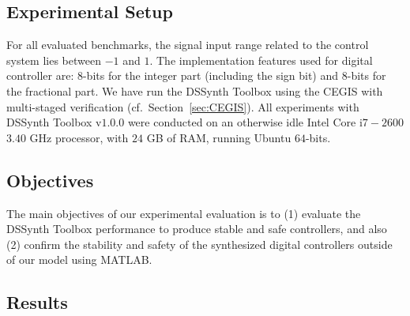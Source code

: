 \documentclass[10pt,conference]{IEEEtran}
\newcommand\tool{{DSSynth Toolbox}\xspace}
\begin{document}

\subsection{Experimental Setup}
\label{experimental-setup}

For all evaluated benchmarks, the signal input range related to the control
system lies between $-1$ and $1$.  The implementation features used for
digital controller are: $8$-bits for the integer part (including the sign
bit) and $8$-bits for the fractional part.  We have run the \tool using the
CEGIS with multi-staged verification (cf.~Section~\ref{sec:CEGIS}).  All
experiments with \tool v$1$.$0$.$0$ were conducted on an otherwise idle
Intel Core i$7-2600$ $3.40$ GHz processor, with $24$ GB of RAM, running
Ubuntu $64$-bits.

\subsection{Objectives}

The main objectives of our experimental evaluation is to (1) evaluate the \tool performance 
to produce stable and safe controllers, and also (2) confirm the stability and safety of the synthesized digital 
controllers outside of our model using MATLAB. %

\subsection{Results}
\end{document}
